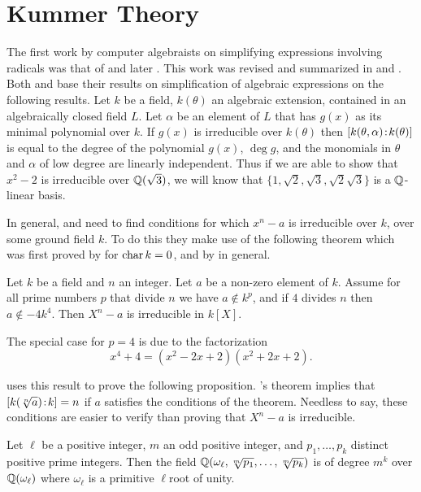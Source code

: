 \section{Kummer Theory}
\label{Kummer:Sec}

The first work by computer algebraists on simplifying expressions
involving radicals was that of {\Caviness}
\cite{Caviness:Thesis,Caviness:Canonical} and later {\Fateman}
\cite{Fateman:Thesis}.  This work was revised and summarized in
{\Caviness} and {\Fateman} \cite{Caviness:Fateman}.  Both {\Caviness}
and {\Fateman} base their results on simplification of algebraic
expressions on the following results.  Let $k$ be a field, $k(\theta)$
an algebraic extension, contained in an algebraically closed field
$L$.  Let $\alpha$ be an element of $L$ that has $g(x)$ as its minimal
polynomial over $k$.  If $g(x)$ is irreducible over $k(\theta)$ then
$[k(\theta,\alpha)\!:\!k(\theta)]$ is equal to the degree of
the polynomial $g(x)$, $\deg g$, and the monomials in $\theta$ and
$\alpha$ of low degree are linearly independent.  Thus if we are able
to show that $x^2 - 2$ is irreducible over $\mathbb{Q}(\sqrt{3})$, we will
know that $\{1, \sqrt{2}, \sqrt{3}, \sqrt{2} \sqrt{3}\}$ is a
$\mathbb{Q}$-linear basis.

In general, {\Caviness} and {\Fateman} need to find conditions for
which $x^n - a$ is irreducible over $k$, over some ground field $k$.
To do this they make use of the following theorem which was first
proved by {\Capelli} \cite{Capelli} for $\mathop{\rm char}\nolimits k = 0$, and by {\Redei}
\cite{Redei} in general.

\begin{proposition}[{\Capelli}] \label{Capelli:Prop}
Let $k$ be a field and $n$ an integer.  Let $a$ be a non-zero element
of $k$.  Assume for all prime numbers $p$ that divide $n$ we have $a
\notin k^p$, and if $4$ divides $n$ then $a \notin -4k^4$.  Then $X^n
- a$ is irreducible in $k[X]$.
\end{proposition}

\noindent
The special case for $p=4$ is due to the factorization 
\[
x^4+4 = (x^2-2x+2)(x^2+2x+2).
\]

{\Caviness} uses this result to prove the following proposition.
{\Capelli}'s theorem implies that $\fieldDegree{k(\root n\of{a})}{k} =
n$ if $a$ satisfies the conditions of the theorem.  Needless to say,
these conditions are easier to verify than proving that $X^n -a$ is
irreducible.

\begin{proposition}
Let $\ell$ be a positive integer, $m$ an odd positive integer, and
$p_1, \ldots, p_k$ distinct positive prime integers.  Then the field
$\Q(\omega_{\ell}, \root m \of {p_1}, \ldots, \root m \of {p_k})$ is
of degree $m^k$ over $\mathbb{Q}(\omega_{\ell})$ where $\omega_{\ell}$ is a
primitive $\ell$\th root of unity.
\end{proposition}

